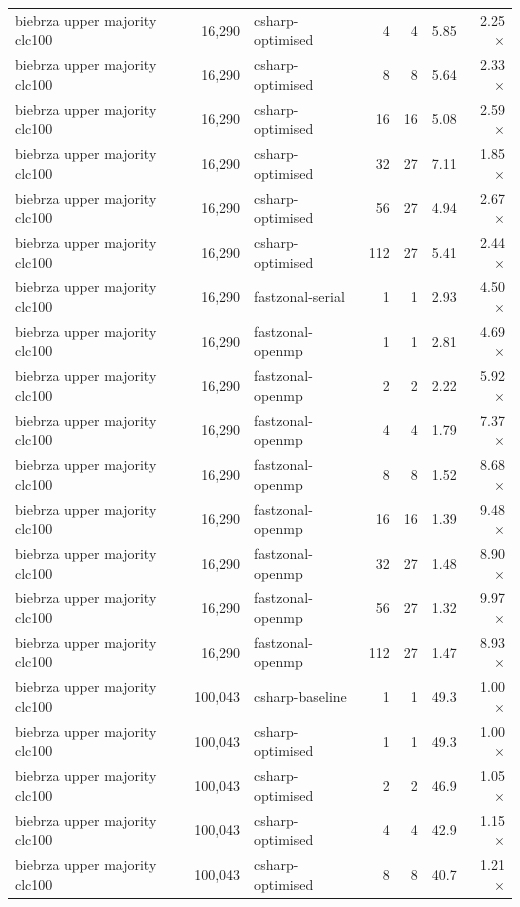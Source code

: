 \begin{tabular}{lrlrrrr}
biebrza upper majority clc100 & 16,290 & csharp-optimised & 4 & 4 & 5.85 & 2.25$\times$ \\
biebrza upper majority clc100 & 16,290 & csharp-optimised & 8 & 8 & 5.64 & 2.33$\times$ \\
biebrza upper majority clc100 & 16,290 & csharp-optimised & 16 & 16 & 5.08 & 2.59$\times$ \\
biebrza upper majority clc100 & 16,290 & csharp-optimised & 32 & 27 & 7.11 & 1.85$\times$ \\
biebrza upper majority clc100 & 16,290 & csharp-optimised & 56 & 27 & 4.94 & 2.67$\times$ \\
biebrza upper majority clc100 & 16,290 & csharp-optimised & 112 & 27 & 5.41 & 2.44$\times$ \\
biebrza upper majority clc100 & 16,290 & fastzonal-serial & 1 & 1 & 2.93 & 4.50$\times$ \\
biebrza upper majority clc100 & 16,290 & fastzonal-openmp & 1 & 1 & 2.81 & 4.69$\times$ \\
biebrza upper majority clc100 & 16,290 & fastzonal-openmp & 2 & 2 & 2.22 & 5.92$\times$ \\
biebrza upper majority clc100 & 16,290 & fastzonal-openmp & 4 & 4 & 1.79 & 7.37$\times$ \\
biebrza upper majority clc100 & 16,290 & fastzonal-openmp & 8 & 8 & 1.52 & 8.68$\times$ \\
biebrza upper majority clc100 & 16,290 & fastzonal-openmp & 16 & 16 & 1.39 & 9.48$\times$ \\
biebrza upper majority clc100 & 16,290 & fastzonal-openmp & 32 & 27 & 1.48 & 8.90$\times$ \\
biebrza upper majority clc100 & 16,290 & fastzonal-openmp & 56 & 27 & 1.32 & 9.97$\times$ \\
biebrza upper majority clc100 & 16,290 & fastzonal-openmp & 112 & 27 & 1.47 & 8.93$\times$ \\
biebrza upper majority clc100 & 100,043 & csharp-baseline & 1 & 1 & 49.3 & 1.00$\times$ \\
biebrza upper majority clc100 & 100,043 & csharp-optimised & 1 & 1 & 49.3 & 1.00$\times$ \\
biebrza upper majority clc100 & 100,043 & csharp-optimised & 2 & 2 & 46.9 & 1.05$\times$ \\
biebrza upper majority clc100 & 100,043 & csharp-optimised & 4 & 4 & 42.9 & 1.15$\times$ \\
biebrza upper majority clc100 & 100,043 & csharp-optimised & 8 & 8 & 40.7 & 1.21$\times$ \\

\end{tabular}
